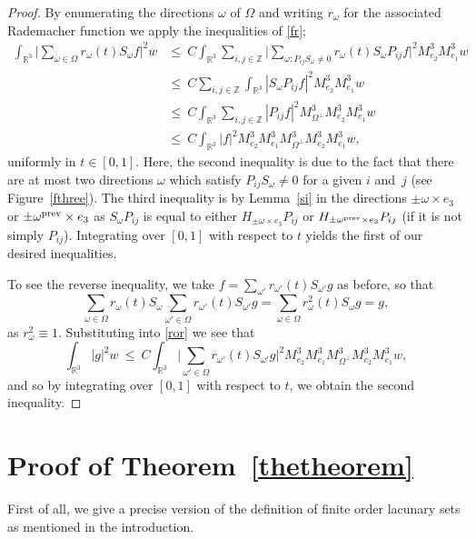 \documentclass[11pt]{amsart}
\theoremstyle{definition}
\theoremstyle{remark}
\begin{document}
\begin{proof}
By enumerating the directions $\omega$ of $\Omega$ and writing $r_\omega$ for the associated Rademacher function we apply the inequalities of \eqref{fr};
\begin{align}\label{ror}
\int_{\mathbb{R}^3}  \Big|\sum_{\omega\in\Omega} r_\omega(t)S_\omega f\Big|^2 w
&{\leqslant} \ C\!\int_{\mathbb{R}^3} \sum_{i,j\in\mathbb{Z}} \Big|\sum_{\omega: P_{ij}S_\omega\neq 0}r_\omega(t)S_\omega P_{ij}f\Big|^2 M^3_{e_2}M^3_{e_1} w\nonumber\\
&{\leqslant} \ C\!\sum_{i,j\in\mathbb{Z}} \int_{\mathbb{R}^3} |S_\omega P_{ij}f|^2 M^3_{e_2}M^3_{e_1} w\\
&{\leqslant}\ C\!\int_{\mathbb{R}^3}  \sum_{i,j\in\mathbb{Z}}|P_{ij}f|^2 M^3_{\Omega^\perp}M^3_{e_2}M^3_{e_1}w\nonumber\\
&{\leqslant} \ C\!\int_{\mathbb{R}^3} |f|^2 M^3_{e_2}M^3_{e_1}M^3_{\Omega^\perp}M^3_{e_2}M^3_{e_1}w,\nonumber
\end{align}
uniformly in $t\in[0,1]$.
Here, the second inequality is due to the fact that there are at
most two directions $\omega$ which satisfy $P_{ij}S_\omega\neq 0$
for a given $i$ and~$j$ (see Figure~\ref{fthree}). The third inequality is by
Lemma~\ref{si} in the directions $\pm\omega\times e_3$ or
$\pm\omega^{\rm prev}\times e_3$ as $S_{\omega}P_{ij}$ is equal to
either $H_{\pm\omega\times e_3}P_{ij}$ or $H_{\pm\omega^{\rm
prev}\times e_3}P_{ij}$ (if it is not simply $P_{ij}$). Integrating
over $[0,1]$ with respect to $t$ yields the first of our desired
inequalities.

To see the reverse inequality, we take $f=\sum_{\omega'}r_{\omega'}(t)S_{\omega'} g$ as before, so that
$$
\sum_{\omega\in\Omega} r_\omega(t)S_\omega\sum_{\omega'\in\Omega}r_{\omega'}(t)S_{\omega'} g=\sum_{\omega\in\Omega} r^2_\omega(t) S_\omega g=g,
$$
as $r^2_\omega\equiv 1$.
Substituting into \eqref{ror} we see that
$$
\int_{\mathbb{R}^3}  |g|^2 w\ {\leqslant} \  C\!\int_{\mathbb{R}^3} \Big|\sum_{\omega'\in\Omega}r_{\omega'}(t)S_{\omega'} g\Big|^2 M^3_{e_2}M^3_{e_1}M^3_{\Omega^\perp}M^3_{e_2}M^3_{e_1}w,
$$
and so by integrating over $[0,1]$ with respect to $t$, we obtain
the second inequality.
\end{proof}

\section{Proof of Theorem~\ref{thetheorem}}\label{four}

First of all,  we give a precise version of the definition of finite order lacunary sets as mentioned in the introduction.
\end{document}
